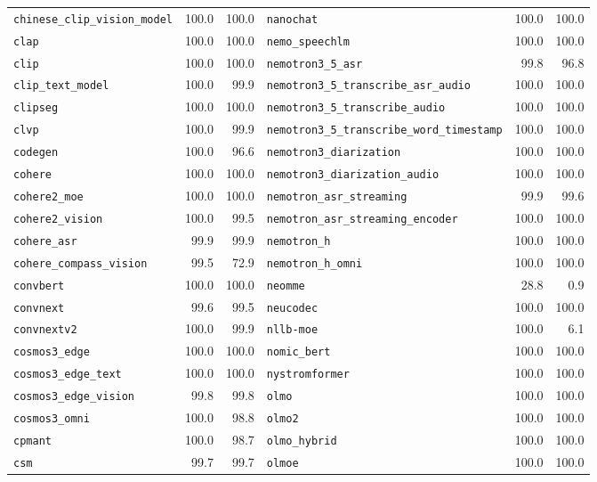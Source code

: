 \begin{longtable}{@{}lrr@{\hspace{24pt}}lrr@{}}
\texttt{chinese\_clip\_vision\_model} & 100.0 & 100.0 & \texttt{nanochat} & 100.0 & 100.0 \\
\texttt{clap} & 100.0 & 100.0 & \texttt{nemo\_speechlm} & 100.0 & 100.0 \\
\texttt{clip} & 100.0 & 100.0 & \texttt{nemotron3\_5\_asr} & 99.8 & 96.8 \\
\texttt{clip\_text\_model} & 100.0 & 99.9 & \texttt{nemotron3\_5\_transcribe\_asr\_audio} & 100.0 & 100.0 \\
\texttt{clipseg} & 100.0 & 100.0 & \texttt{nemotron3\_5\_transcribe\_audio} & 100.0 & 100.0 \\
\texttt{clvp} & 100.0 & 99.9 & \texttt{nemotron3\_5\_transcribe\_word\_timestamp} & 100.0 & 100.0 \\
\texttt{codegen} & 100.0 & 96.6 & \texttt{nemotron3\_diarization} & 100.0 & 100.0 \\
\texttt{cohere} & 100.0 & 100.0 & \texttt{nemotron3\_diarization\_audio} & 100.0 & 100.0 \\
\texttt{cohere2\_moe} & 100.0 & 100.0 & \texttt{nemotron\_asr\_streaming} & 99.9 & 99.6 \\
\texttt{cohere2\_vision} & 100.0 & 99.5 & \texttt{nemotron\_asr\_streaming\_encoder} & 100.0 & 100.0 \\
\texttt{cohere\_asr} & 99.9 & 99.9 & \texttt{nemotron\_h} & 100.0 & 100.0 \\
\texttt{cohere\_compass\_vision} & 99.5 & 72.9 & \texttt{nemotron\_h\_omni} & 100.0 & 100.0 \\
\texttt{convbert} & 100.0 & 100.0 & \texttt{neomme} & 28.8 & 0.9 \\
\texttt{convnext} & 99.6 & 99.5 & \texttt{neucodec} & 100.0 & 100.0 \\
\texttt{convnextv2} & 100.0 & 99.9 & \texttt{nllb-moe} & 100.0 & 6.1 \\
\texttt{cosmos3\_edge} & 100.0 & 100.0 & \texttt{nomic\_bert} & 100.0 & 100.0 \\
\texttt{cosmos3\_edge\_text} & 100.0 & 100.0 & \texttt{nystromformer} & 100.0 & 100.0 \\
\texttt{cosmos3\_edge\_vision} & 99.8 & 99.8 & \texttt{olmo} & 100.0 & 100.0 \\
\texttt{cosmos3\_omni} & 100.0 & 98.8 & \texttt{olmo2} & 100.0 & 100.0 \\
\texttt{cpmant} & 100.0 & 98.7 & \texttt{olmo\_hybrid} & 100.0 & 100.0 \\
\texttt{csm} & 99.7 & 99.7 & \texttt{olmoe} & 100.0 & 100.0 \\

\end{longtable}
